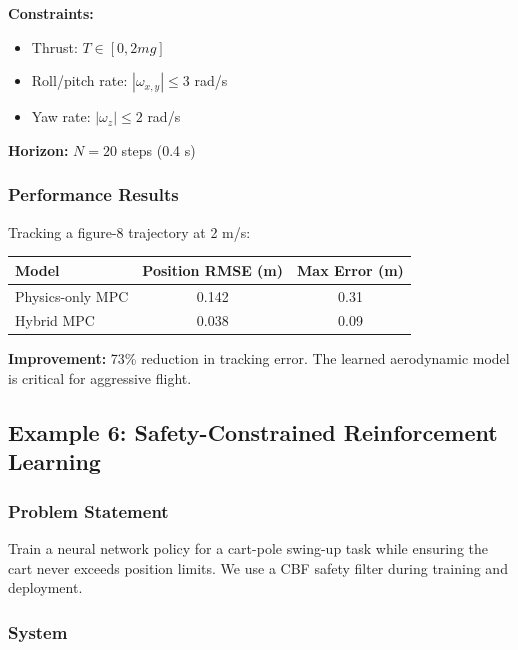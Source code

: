 \textbf{Constraints:}
\begin{itemize}
    \item Thrust: $T \in [0, 2mg]$
    \item Roll/pitch rate: $|\omega_{x,y}| \leq 3$ rad/s
    \item Yaw rate: $|\omega_z| \leq 2$ rad/s
\end{itemize}

\textbf{Horizon:} $N = 20$ steps (0.4 s)

\subsubsection{Performance Results}

Tracking a figure-8 trajectory at 2 m/s:

\begin{center}
\begin{tabular}{lcc}
\toprule
\textbf{Model} & \textbf{Position RMSE (m)} & \textbf{Max Error (m)} \\
\midrule
Physics-only MPC & 0.142 & 0.31 \\
Hybrid MPC & 0.038 & 0.09 \\
\bottomrule
\end{tabular}
\end{center}

\textbf{Improvement:} 73\% reduction in tracking error. The learned aerodynamic model is critical for aggressive flight.

\subsection{Example 6: Safety-Constrained Reinforcement Learning}
\label{ex:safe_rl}

\subsubsection{Problem Statement}

Train a neural network policy for a cart-pole swing-up task while ensuring the cart never exceeds position limits. We use a CBF safety filter during training and deployment.

\subsubsection{System}


